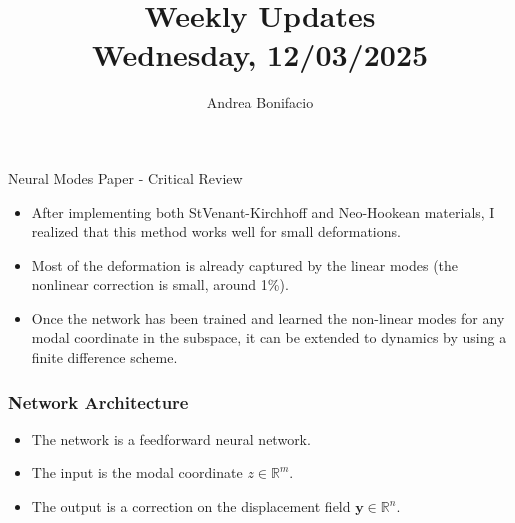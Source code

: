\documentclass{beamer}
\title{Weekly Updates\\
\tiny{Wednesday, 12/03/2025}}
\author{Andrea Bonifacio}
\date{}
\begin{document}
\begin{frame}
\titlepage
\end{frame}


\begin{frame}{Neural Modes Paper - Critical Review}
    \begin{itemize}
        \item After implementing both StVenant-Kirchhoff and Neo-Hookean materials, I realized that this method works well for small deformations.
        \item Most of the deformation is already captured by the linear modes (the nonlinear correction is small, around 1\%).
        \item Once the network has been trained and learned the non-linear modes for any modal coordinate in the subspace, it can be extended to dynamics by using a finite difference scheme.
    \end{itemize}
\end{frame}


\begin{frame}
    \frametitle{Network Architecture}
    \begin{itemize}
        \item The network is a feedforward neural network.
        \item The input is the modal coordinate \( z \in \mathbb{R}^m \).
        \item The output is a correction on the displacement field \( \mathbf{y} \in \mathbb{R}^n \).
    \end{itemize}



\begin{center}
        
\end{center}
    
\end{frame}
\end{document}
